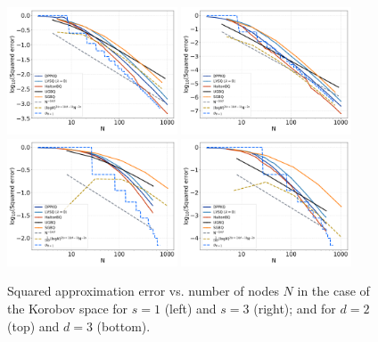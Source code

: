 \documentclass[twoside,11pt]{book}
\numberwithin{theorem}{chapter}
\numberwithin{definition}{chapter}
\numberwithin{proposition}{chapter}
\numberwithin{corollary}{chapter}
\numberwithin{example}{chapter}
\numberwithin{lemma}{chapter}
\numberwithin{assumption}{chapter}
\begin{document}
\begin{figure}
\centering
\includegraphics[width=0.45\textwidth]{img/neurips/multiSobolev/Sobolev_2D_ko_1_fig_L_2.pdf}
\includegraphics[width=0.45\textwidth]{img/neurips/multiSobolev/Sobolev_2D_ko_2_fig_L_2.pdf}\\
\includegraphics[width=0.45\textwidth]{img/neurips/multiSobolev/Sobolev_3D_ko_1_fig_L_2.pdf}
\includegraphics[width=0.45\textwidth]{img/neurips/multiSobolev/Sobolev_3D_ko_2_fig_L_2.pdf}
\caption{Squared approximation error vs. number of nodes $N$ in the case of the Korobov space for $s = 1$ (left) and $s=3$ (right); and for $d =2$ (top) and $d=3$ (bottom).
\label{fig:Korobov_DPPKQ_multialgo_results}}
\end{figure} 
\end{document}
